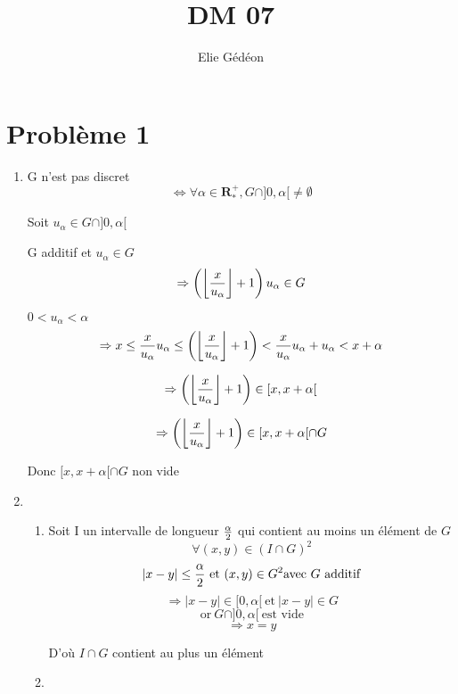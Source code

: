 \documentclass[11pt,a4paper,fleqn]{article}
\author{Elie G\'ed\'eon}
\title{DM 07}
\begin{document}
\maketitle

\part*{Probl\`eme 1}

\begin{enumerate}
	\item

  G n'est pas discret
  \[  \Leftrightarrow \forall \alpha \in \mathbf{R^+_*}, G \cap \rbrack 0, \alpha \lbrack \neq \emptyset  \]
	
	Soit $u_\alpha \in G \cap \rbrack 0, \alpha \lbrack$
	
	G additif et $u_\alpha \in G$
	\[\Rightarrow \left ( \left \lfloor {x \over u_\alpha} \right \rfloor + 1 \right ) u_\alpha \in G\]
	
	$0 < u_\alpha < \alpha$
	\[	\Rightarrow x \leq  {x \over u_\alpha} u_\alpha \leq
	\left (\left \lfloor {x \over u_\alpha} \right \rfloor + 1 \right )
	< {x \over u_\alpha} u_\alpha + u_\alpha < x + \alpha	\]
	
	\[	\Rightarrow \left (\left \lfloor {x \over u_\alpha} \right \rfloor + 1 \right ) \in \lbrack x, x + \alpha \lbrack	\]
	
	\[	\Rightarrow
	\left (\left \lfloor {x \over u_\alpha} \right \rfloor + 1 \right )
	\in \lbrack x, x + \alpha \lbrack \cap G	\]
	
	Donc $\lbrack x, x + \alpha \lbrack \cap G$ non vide
		

	\item
		\begin{enumerate}
			
			\item	

				Soit I un intervalle de longueur $\alpha \over 2$ qui contient au moins un \'el\'ement de $G$
				\[\forall (x,y) \in (I \cap G)^2\]
				\[|x - y| \leq {\alpha \over 2} ~ \textrm{et} ~ (x, y) \in G^2 \textrm{avec} ~G~ \textrm{additif} \]
				\[\Rightarrow |x - y| \in \lbrack 0 , \alpha \lbrack ~ \textrm{et} ~ |x - y| \in G \]
 	 		  \[\textrm{or} ~ G \cap \rbrack 0 , \alpha \lbrack ~ \textrm{est vide} \]
	 	 		\[\Rightarrow x = y \]
 	 			 	 		
 	 			D'o\`u $I \cap G$ contient au plus un \'el\'ement
				
			\item
					

\end{enumerate}
\end{enumerate}
\end{document}
